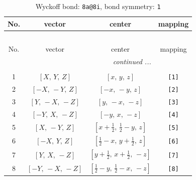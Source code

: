 \documentclass[fleqn,8pt]{jsarticle}
\begin{document}
\begin{longtable}{cccc}
\caption{Wyckoff bond: {\tt 8a@8i}, bond symmetry: {\tt 1}}
 \\
 \hline \hline
No. & vector & center & mapping \\ \hline \endfirsthead

\multicolumn{3}{l}{\tablename\ \thetable{}} \\
 \hline \hline
No. & vector & center & mapping \\ \hline \endhead

 \hline \hline
\multicolumn{3}{r}{\footnotesize\it continued ...} \\ \endfoot

 \hline \hline
\multicolumn{3}{r}{} \\ \endlastfoot

1 & $\left[ X,\, Y,\, Z \right]$ & $\left[ x,\, y,\, z \right]$ & {\tt [1]} \\ \hline
2 & $\left[ - X,\, - Y,\, Z \right]$ & $\left[ - x,\, - y,\, z \right]$ & {\tt [2]} \\ \hline
3 & $\left[ Y,\, - X,\, - Z \right]$ & $\left[ y,\, - x,\, - z \right]$ & {\tt [3]} \\ \hline
4 & $\left[ - Y,\, X,\, - Z \right]$ & $\left[ - y,\, x,\, - z \right]$ & {\tt [4]} \\ \hline
5 & $\left[ X,\, - Y,\, Z \right]$ & $\left[ x + \frac{1}{2},\, \frac{1}{2} - y,\, z \right]$ & {\tt [5]} \\ \hline
6 & $\left[ - X,\, Y,\, Z \right]$ & $\left[ \frac{1}{2} - x,\, y + \frac{1}{2},\, z \right]$ & {\tt [6]} \\ \hline
7 & $\left[ Y,\, X,\, - Z \right]$ & $\left[ y + \frac{1}{2},\, x + \frac{1}{2},\, - z \right]$ & {\tt [7]} \\ \hline
8 & $\left[ - Y,\, - X,\, - Z \right]$ & $\left[ \frac{1}{2} - y,\, \frac{1}{2} - x,\, - z \right]$ & {\tt [8]} \\
\end{longtable}
\end{document}

